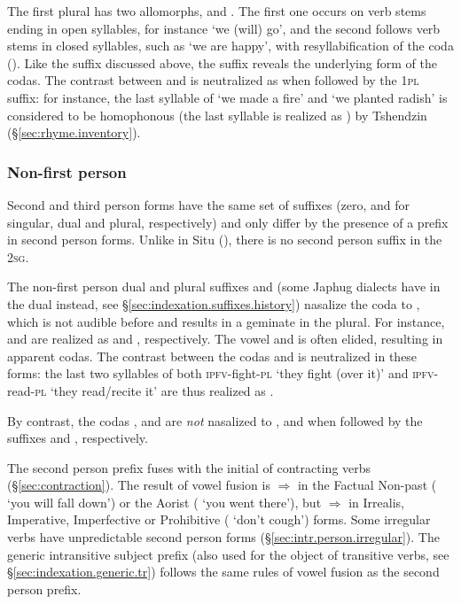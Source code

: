 The first plural  has two allomorphs,  and . The first one occurs on verb stems ending in open syllables, for instance  `we (will) go', and the second follows verb stems in closed syllables, such as  `we are happy', with resyllabification of the coda (). Like the  suffix discussed above, the suffix  reveals the underlying form of the codas. The contrast between  and  is neutralized as  when followed by the \textsc{1pl} suffix: for instance, the last syllable of  `we made a fire'  and  `we planted radish' is considered to be homophonous (the last syllable is realized as ) by Tshendzin (§\ref{sec:rhyme.inventory}).

\subsubsection{Non-first person} \label{sec:intr.23}
Second and third person forms have the same set of suffixes (zero,  and  for singular, dual and plural, respectively) and only differ by the presence of a  prefix in second person forms. Unlike in Situ (\citealt[197--208]{linxr93jiarong}), there is no second person suffix in the \textsc{2sg}.

The non-first person dual and plural suffixes  and  (some Japhug dialects have  in the dual instead, see §\ref{sec:indexation.suffixes.history}) nasalize the coda  to , which is not audible before  and results in a geminate in the plural. For instance,  and  are realized as  and , respectively. The vowel  and  is often elided, resulting in apparent  codas. The contrast between the codas  and  is neutralized in these forms: the last two syllables of both  \textsc{ipfv}-fight-\textsc{pl} `they fight (over it)' and   \textsc{ipfv}-read-\textsc{pl} `they read/recite it' are thus realized as . 

By contrast, the codas ,  and  are \textit{not} nasalized to ,  and  when followed by the suffixes  and , respectively.

The second person  prefix fuses with the initial  of contracting verbs (§\ref{sec:contraction}). The result of vowel fusion is  $\Rightarrow$  in the Factual Non-past ( `you will fall down') or the Aorist ( `you went there'), but  $\Rightarrow$  in Irrealis, Imperative, Imperfective or Prohibitive ( `don't cough') forms. Some irregular verbs have unpredictable second person forms (§\ref{sec:intr.person.irregular}). The generic intransitive subject prefix  (also used for the object of transitive verbs, see §\ref{sec:indexation.generic.tr}) follows the same rules of vowel fusion as the second person prefix.


